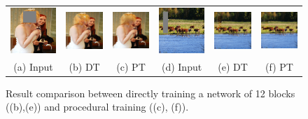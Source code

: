 \begin{figure}[h!]
\centering
\small
\begin{tabular}{cccccc}
\includegraphics[width=.16\textwidth]{figures/proc/000000241668_input_image.png}&
\includegraphics[width=.16\textwidth]{figures/proc/000000241668_synthesized_image-1.png}&
\includegraphics[width=.16\textwidth]{figures/proc/000000241668_synthesized_image.png}&
\includegraphics[width=.16\textwidth]{figures/proc/000000314034_input_image.png}&
\includegraphics[width=.16\textwidth]{figures/proc/000000314034_synthesized_image-1.png}&
\includegraphics[width=.16\textwidth]{figures/proc/000000314034_synthesized_image.png}\\
(a) Input & (b) DT & (c) PT & (d) Input & (e) DT & (f) PT \\
\end{tabular}
\caption{Result comparison between directly training a network of 12 blocks ((b),(e)) and procedural training ((c), (f)).}
\label{fig:proc}
\vspace{-10pt}
\end{figure}  

